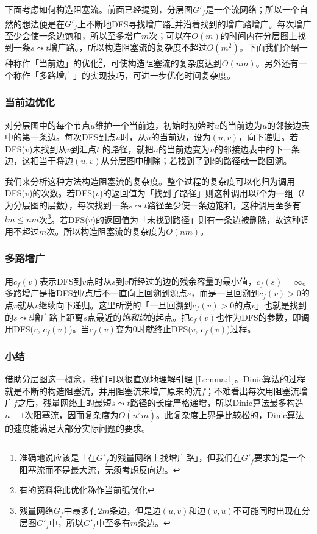 \documentclass[a4paper]{ctexbook}
\begin{document}
  下面考虑如何构造阻塞流。前面已经提到，分层图$G'_f$是一个流网络；所以一个自然的想法便是在$G'_f$上不断地DFS寻找增广路\footnote{准确地说应该是「在$G'_f$的残量网络上找增广路」，但我们在$G'_f$要求的是一个阻塞流而不是最大流，无须考虑反向边。}并沿着找到的增广路增广。每次增广至少会使一条边饱和，所以至多增广$m$次；可以在$O(m)$的时间内在分层图上找到一条$s\leadsto t$增广路。，所以构造阻塞流的复杂度不超过$O(m^2)$。下面我们介绍一种称作「当前边」的优化\footnote{有的资料将此优化称作当前弧优化}，可使构造阻塞流的复杂度达到$O(nm)$。另外还有一个称作「多路增广」的实现技巧，可进一步优化时间复杂度。
  \subsubsection*{当前边优化}
  对分层图中的每个节点$u$维护一个当前边，初始时初始时$u$的当前边为$u$的邻接边表中的第一条边。每次DFS到点$u$时，从$u$的当前边，设为$(u,v)$，向下递归。若DFS($v$)未找到从$v$到汇点$t$ 的路径，就把$u$的当前边变为$u$的邻接边表中的下一条边，这相当于将边$(u,v)$从分层图中删除；若找到了到$t$的路径就一路回溯。

  我们来分析这种方法构造阻塞流的复杂度。整个过程的复杂度可以化归为调用DFS($v$)的次数。若DFS($v$)的返回值为「找到了路径」则这种调用以$l$个为一组（$l$为分层图的层数），每次找到一条$s\leadsto t$路径至少使一条边饱和，这种调用至多有$lm\le nm$次\footnote{残量网络$G_f$中最多有$2m$条边，但是边$(u,v)$和边$(v,u)$不可能同时出现在分层图$G'_f$中，所以$G'_f$中至多有$m$条边。}。若DFS($v$)的返回值为「未找到路径」则有一条边被删除，故这种调用不超过$m$次。所以构造阻塞流的复杂度为$O(nm)$。
  \subsubsection*{多路增广}
  用$c_f(v)$表示DFS到$v$点时从$s$到$v$所经过的边的残余容量的最小值，$c_f(s) = \infty$。
  多路增广是指DFS到$t$点后不一直向上回溯到源点$s$，而是一旦回溯到$c_f(v)>0$的点$v$就从$v$继续向下递归。这里所说的「一旦回溯到$c_f(v)>0$的点$v$」也就是找到的$s\leadsto t$增广路上距离$s$点最近的\emph{饱和边}的起点。把$c_f(v)$也作为DFS的参数，即调用DFS($v$, $c_f(v)$)。当$c_f(v)$变为$0$时就终止DFS($v$, $c_f(v)$)过程。

  \subsubsection*{小结}
  借助分层图这一概念，我们可以很直观地理解引理 \ref{Lemma:1}。Dinic算法的过程就是不断的构造阻塞流，并用阻塞流来增广原来的流$f$；不难看出每次用阻塞流增广$f$之后，残量网络上的最短$s\leadsto t$路径的长度严格递增，所以Dinic算法最多构造$n-1$次阻塞流，因而复杂度为$O(n^2m)$。此复杂度上界是比较松的，Dinic算法的速度能满足大部分实际问题的要求。
\end{document}

